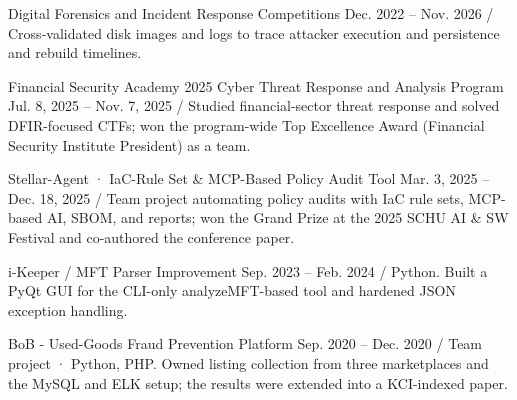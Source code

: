     \resumeProject
      {Digital Forensics and Incident Response Competitions}
      {Dec. 2022 -- Nov. 2026 / Cross-validated disk images and logs to trace attacker execution and persistence and rebuild timelines.}
      \resumeItemListStart
      \resumeItemListEnd

    \resumeProject
      {Financial Security Academy 2025 Cyber Threat Response and Analysis Program}
      {Jul. 8, 2025 -- Nov. 7, 2025 / Studied financial-sector threat response and solved DFIR-focused CTFs; won the program-wide Top Excellence Award (Financial Security Institute President) as a team.}
      \resumeItemListStart
      \resumeItemListEnd

    \resumeProject
      {Stellar-Agent · IaC-Rule Set \& MCP-Based Policy Audit Tool}
      {Mar. 3, 2025 -- Dec. 18, 2025 / Team project automating policy audits with IaC rule sets, MCP-based AI, SBOM, and reports; won the Grand Prize at the 2025 SCHU AI \& SW Festival and co-authored the conference paper.}
      \resumeItemListStart
      \resumeItemListEnd

    \resumeProject
      {i-Keeper / MFT Parser Improvement}
      {Sep. 2023 -- Feb. 2024 / Python. Built a PyQt GUI for the CLI-only analyzeMFT-based tool and hardened JSON exception handling.}

    \resumeProject
      {BoB - Used-Goods Fraud Prevention Platform}
      {Sep. 2020 -- Dec. 2020 / Team project · Python, PHP. Owned listing collection from three marketplaces and the MySQL and ELK setup; the results were extended into a KCI-indexed paper.}
  \resumeSubHeadingListEnd

